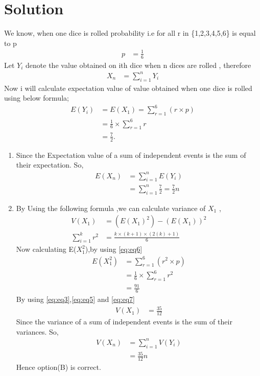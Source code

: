 \documentclass[journal,12pt,twocolumn]{IEEEtran}
\begin{document}
\section{Solution}
We know, when one dice is rolled probability i.e  for all r in \{1,2,3,4,5,6\} is equal to  p
\begin{align}
    p&=\frac{1}{6}
\end{align}
Let $Y_{i}$ denote the value obtained on ith dice when n dices are rolled  
, therefore 
\begin{align}
  X_{n}&=\sum_{i=1}^n Y_{i}
  \label{eq:eq1}
\end{align}
Now i will calculate expectation value of value obtained when one dice is rolled
using below formula;
\begin{align}
 E(Y_{i})&= E( X_{1}) =\sum_{r=1}^6 (r\times p)
 \label{eq:eq2}
\\
&=\frac{1}{6} \times \sum_{r=1}^6 r
\\
&=\frac{7}{2}.
\label{eq:eq3}
\end{align}
\begin{enumerate}
\item Since the Expectation value of a sum of independent events is the sum of their expectation. So,
\begin{align}
    E(X_{n})&=\sum_{i=1}^n E(Y_{i})
    \\
    & = \sum_{i=1}^n \frac{7}{2} =\frac{7}{2} n 
\label{eq:eq4}
\end{align}
\item By Using the following formula ,we can calculate variance of  $X_{1}$ ,
\begin{align}
    V(X_{1})&=(E(X_{1})^{2}) - (E(X_{1}))^{2}
    \label{eq:eq5}
    \\
    \sum_{i=1}^k r^2&=\frac{k\times (k+1 )\times (2(k)+1)}{6}
    \label{eq:eq6}
\end{align}
Now calculating E($X_{1}^{2}$),by using \eqref{eq:eq6}
\begin{align}
    E(X_{1}^{2})&=\sum_{r=1}^6(r^{2}\times p)
    \\
    &=\frac{1}{6}\times\sum_{r=1}^6r^{2}
    \\
    &=\frac{91}{6}
    \label{eq:eq7}
\end{align}
By using \eqref{eq:eq3},\eqref{eq:eq5} and \eqref{eq:eq7}
\begin{align}
    V(X_{1})&=\frac{35}{12}
    \label{eq:eq8}
\end{align}
Since the variance of a sum of independent events is the sum of their variances. So,
\begin{align}
    V(X_{n})&=\sum_{i=1}^n  V(Y_{i})
    \\
    &= \frac{35}{12}n
\end{align}
    Hence option(B) is correct.
\end{enumerate}
\end{document}
